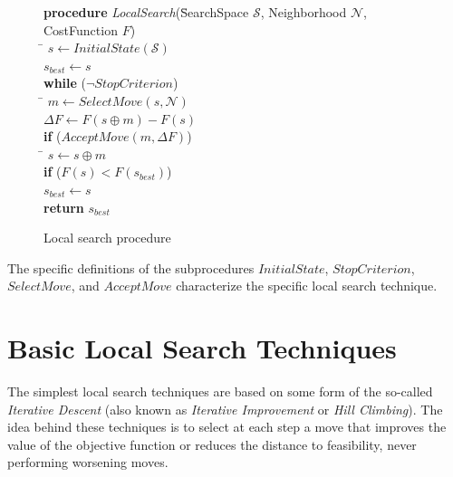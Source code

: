 \begin{figure}
  \centering
  \begin{tabbing}
    \textbf{procedure} \emph{LocalSearch}(\= SearchSpace $\mathcal{S}$, Neighborhood $\mathcal{N}$, CostFunction $F$) \\ 
    \hspace{4ex}\= $s \leftarrow InitialState(\mathcal{S})$\\
     \> $s_{best} \leftarrow s$ \\
    \> \textbf{while} ($\neg StopCriterion$)\\
    \> \hspace{4ex}\= $m \leftarrow SelectMove(s,\mathcal{N})$ \\
    \> \> $\Delta F \leftarrow F(s \oplus m) - F(s)$\\
    \> \> \textbf{if} ($AcceptMove(m,\Delta F)$)\\
    \> \> \hspace{4ex} \= $s \leftarrow s \oplus m$ \\
    \> \> \> \textbf{if} ($F(s) < F(s_{best})$)\\
    \> \> \> \hspace{4ex} $s_{best} \leftarrow s$ \\
    \> \textbf{return} $s_{best}$ %
  \end{tabbing}
  
  \caption{Local search procedure}
\label{fig:local-search-pseudocode}
\end{figure}

The specific definitions of the subprocedures $InitialState$, $StopCriterion$, $SelectMove$, and $AcceptMove$ characterize the specific local search technique.

\section{Basic Local Search Techniques}\label{sec:basics}

The simplest local search techniques are based on some
form of the so-called \emph{Iterative Descent} (also known as
\emph{Iterative Improvement} or \emph{Hill Climbing}).  The idea behind these 
techniques is to select at each step a move that improves the value of the objective
function or reduces the distance to feasibility, never
performing worsening moves.


